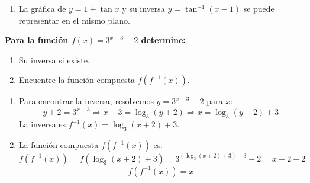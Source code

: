 \documentclass[12pt,answers]{exam}
\begin{document}
\begin{questions}
\begin{solution}
\begin{enumerate}[label=\alph*.]
    \item La gráfica de $y = 1 + \tan x$ y su inversa $y = \tan^{-1}(x - 1)$ se puede representar en el mismo plano.
\end{enumerate}
\vspace{0.5cm}
\begin{center}
\end{center}
\vspace{0.5cm}
\end{solution}

\vspace{0.5cm}

\question \large\textbf{Para la función $\displaystyle f(x) = 3^{x-3}-2$ determine:}
\begin{enumerate}[label=\alph*.]
    \item Su inversa si existe.
    \item Encuentre la función compuesta $f(f^{-1}(x))$.
\end{enumerate}
\begin{solution}
\begin{enumerate}[label=\alph*.]
    \item Para encontrar la inversa, resolvemos $y = 3^{x-3} - 2$ para $x$:
    \[
    y + 2 = 3^{x-3} \Rightarrow x - 3 = \log_3(y + 2) \Rightarrow x = \log_3(y + 2) + 3
    \]
    La inversa es $f^{-1}(x) = \log_3(x + 2) + 3$.
    
    \item La función compuesta $f(f^{-1}(x))$ es:
    \[
    f(f^{-1}(x)) = f(\log_3(x + 2) + 3) = 3^{(\log_3(x + 2) + 3) - 3} - 2 = x + 2 - 2
    \]
    \[
    f(f^{-1}(x)) = x
    \]
\end{enumerate}
\vspace{0.5cm}
\end{solution}


\end{questions}
\end{document}

